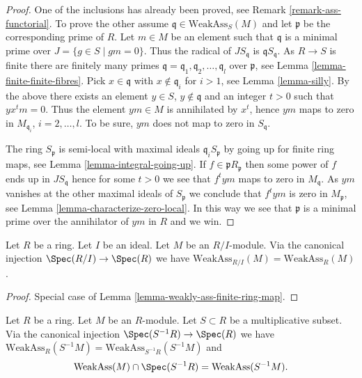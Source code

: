 \begin{proof}
One of the inclusions has already been proved, see
Remark \ref{remark-ass-functorial}.
To prove the other assume $\mathfrak q \in \text{WeakAss}_S(M)$
and let $\mathfrak p$ be the corresponding prime of $R$. Let $m \in M$
be an element such that $\mathfrak q$ is a minimal prime over
$J = \{g \in S \mid gm = 0\}$. Thus the radical of
$JS_{\mathfrak q}$ is $\mathfrak qS_{\mathfrak q}$.
As $R \to S$ is finite there are
finitely many primes
$\mathfrak q = \mathfrak q_1, \mathfrak q_2, \ldots, \mathfrak q_l$
over $\mathfrak p$, see
Lemma \ref{lemma-finite-finite-fibres}.
Pick $x \in \mathfrak q$ with $x \not \in \mathfrak q_i$ for $i > 1$, see
Lemma \ref{lemma-silly}.
By the above there exists an element $y \in S$, $y \not \in \mathfrak q$
and an integer $t > 0$ such that $y x^t m = 0$. Thus the element
$ym \in M$ is annihilated by $x^t$, hence $ym$ maps to zero in
$M_{\mathfrak q_i}$, $i = 2, \ldots, l$. To be sure, $ym$ does not
map to zero in $S_{\mathfrak q}$.

\medskip\noindent
The ring $S_{\mathfrak p}$ is semi-local with maximal ideals
$\mathfrak q_i S_{\mathfrak p}$ by going up for finite ring maps, see
Lemma \ref{lemma-integral-going-up}.
If $f \in \mathfrak pR_{\mathfrak p}$ then some power of $f$ ends
up in $JS_{\mathfrak q}$ hence for some $t > 0$ we see that
$f^t ym$ maps to zero in $M_{\mathfrak q}$. As $ym$ vanishes at the
other maximal ideals of $S_{\mathfrak p}$ we conclude that $f^t ym$ is zero
in $M_{\mathfrak p}$, see
Lemma \ref{lemma-characterize-zero-local}.
In this way we see that $\mathfrak p$ is a minimal prime over
the annihilator of $ym$ in $R$ and we win.
\end{proof}

\begin{lemma}
\label{lemma-weakly-ass-quotient-ring}
Let $R$ be a ring.
Let $I$ be an ideal.
Let $M$ be an $R/I$-module.
Via the canonical injection
$\Spec(R/I) \to \Spec(R)$
we have $\text{WeakAss}_{R/I}(M) = \text{WeakAss}_R(M)$.
\end{lemma}

\begin{proof}
Special case of Lemma \ref{lemma-weakly-ass-finite-ring-map}.
\end{proof}

\begin{lemma}
\label{lemma-localize-weakly-ass}
Let $R$ be a ring. Let $M$ be an $R$-module.
Let $S \subset R$ be a multiplicative subset.
Via the canonical injection $\Spec(S^{-1}R) \to \Spec(R)$
we have $\text{WeakAss}_R(S^{-1}M) = \text{WeakAss}_{S^{-1}R}(S^{-1}M)$
and
$$
\text{WeakAss}(M) \cap \Spec(S^{-1}R) = \text{WeakAss}(S^{-1}M).
$$
\end{lemma}

